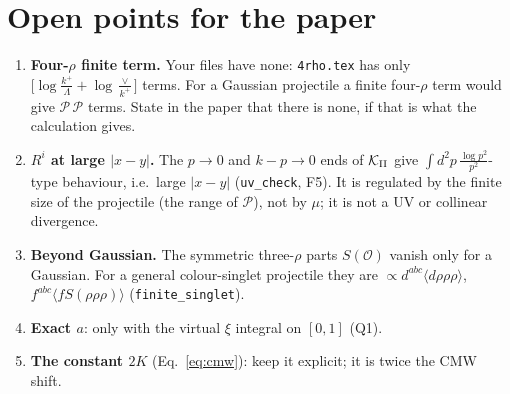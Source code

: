 \documentclass[10pt]{article}
\numberwithin{equation}{section}
\newcommand{\PP}{\mathcal P}
\newcommand{\OO}{\mathcal O}
\begin{document}
\section{Open points for the paper}\label{sec:open}
\begin{enumerate}
\item \textbf{Four-$\rho$ finite term.} Your files have none: \texttt{4rho.tex} has only $\big[\log\frac{k^+}{\Lambda}+\log\frac{\vee}{k^+}\big]$ terms. For a Gaussian projectile a finite four-$\rho$ term would give $\PP\,\PP$ terms. State in the paper that there is none, if that is what the calculation gives.
\item \textbf{$R^i$ at large $|x-y|$.} The $p\to0$ and $k-p\to0$ ends of $\mathcal K_{\rm II}$ give $\int d^2p\,\frac{\log p^2}{p^2}$-type behaviour, i.e.\ large $|x-y|$ (\texttt{uv\_check}, F5). It is regulated by the finite size of the projectile (the range of $\PP$), not by $\mu$; it is not a UV or collinear divergence.
\item \textbf{Beyond Gaussian.} The symmetric three-$\rho$ parts $S(\OO)$ vanish only for a Gaussian. For a general colour-singlet projectile they are $\propto d^{abc}\langle d\rho\rho\rho\rangle$, $f^{abc}\langle fS(\rho\rho\rho)\rangle$ (\texttt{finite\_singlet}).
\item \textbf{Exact $a$}: only with the virtual $\xi$ integral on $[0,1]$ (Q1).
\item \textbf{The constant $2K$} (Eq.~\eqref{eq:cmw}): keep it explicit; it is twice the CMW shift.
\end{enumerate}
\end{document}
